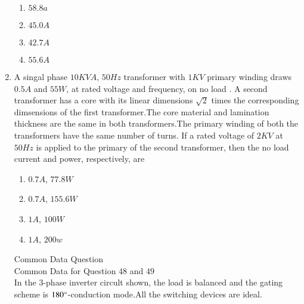 \documentclass[journal]{IEEEtran}
\begin{document}
\begin{enumerate}
    \begin{enumerate}
        \item$58.8 a$\\
        \item$45.0 A$\\
        \item$42.7 A$\\
        \item$55.6 A$
    \end{enumerate}
    \item A singal phase $10 KV A$, $50 Hz$ transformer with $1 KV$ primary winding draws $0.5 A$ and $55 W$, at rated voltage and frequency, on no load . A second transformer has a core with its linear dimensions $\sqrt{2}$ times the corresponding dimsensions of the first transformer.The core material and lamination thickness are the same in both transformers.The primary winding of both the transformers have the same number of turns. If a rated voltage of $2 KV$ at $50 Hz$ is applied to the primary of the second transformer, then the no load current and power, respectively, are\\
    \begin{enumerate}
        \item$0.7 A$, $77.8 W$\\
        \item$0.7 A$, $155.6 W$\\
        \item$1 A$, $100 W$\\
        \item$1 A$, $200 w$
    \end{enumerate}
    Common Data Question\\
    Common Data for Question $48$ and $49$\\
    In the 3-phase inverter circult shown, the load is balanced and the gating scheme is $180\degree$-conduction mode.All the switching devices are ideal.
\end{enumerate}
\end{document}

